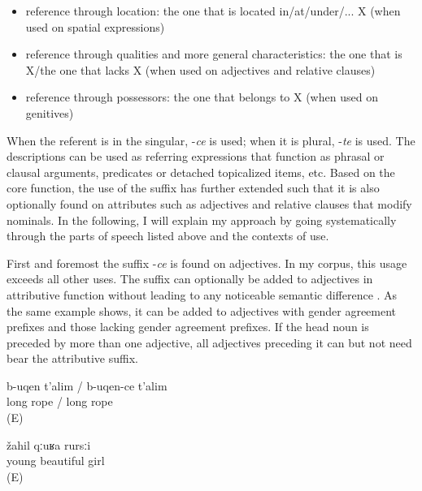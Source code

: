 \begin{itemize}
\item reference through location: the one that is located in/at/under/... X (when used on spatial expressions)
\item reference through qualities and more general characteristics: the one that is X\slash the one that lacks X (when used on adjectives and relative clauses)
\item reference through possessors: the one that belongs to X (when used on genitives)
\end{itemize}

When the referent is in the singular, -\textit{ce} is used; when it is plural, -\textit{te} is used. The descriptions can be used as referring expressions that function as phrasal or clausal arguments, predicates or detached topicalized items, etc. Based on the core function, the use of the suffix has further extended such that it is also optionally found on attributes such as adjectives and relative clauses that modify nominals. In the following, I will explain my approach by going systematically through the parts of speech listed above and the contexts of use.

First and foremost the suffix -\textit{ce} is found on adjectives. In my corpus, this usage exceeds all other uses. The suffix can optionally be added to adjectives in attributive function without leading to any noticeable semantic difference . As the same example shows, it can be added to adjectives with gender agreement prefixes and those lacking gender agreement prefixes. If the head noun is preceded by more than one adjective, all adjectives preceding it can but not need bear the attributive suffix.
%
\begin{exe}
	\ex	\label{ex:a long rope minor}
	\gll	b-uqen	t'alim	/	b-uqen-ce	t'alim\\
		long	rope		/	long	rope\\
	\glt	{} (E)

	\ex	\label{ex:‎‎a young, beautiful girl minor}
	\gll	žahil	qːuʁa	rursːi\\
		young	beautiful	girl\\
	\glt	{} (E)

	\ex	\label{ex:‎‎a young, beautiful girl minor second}
	\begin{xlist}
		\ex	{}		\label{ex:‎‎a young, beautiful girl minor@A}
		\ex	{}	\label{ex:‎‎a young, beautiful girl minor@B}
		\ex	{}	\label{ex:‎‎a young, beautiful girl minor@C}
	\end{xlist}
\end{exe}

